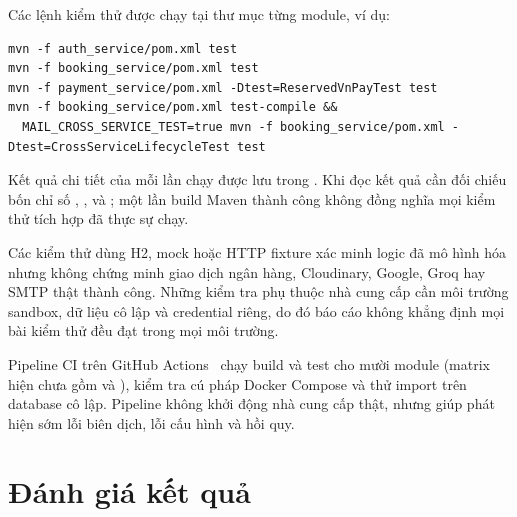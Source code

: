 Các lệnh kiểm thử được chạy tại thư mục từng module, ví dụ:

\begin{lstlisting}[style=json,caption={Lệnh kiểm thử tiêu biểu},label={lst:test-cmd}]
mvn -f auth_service/pom.xml test
mvn -f booking_service/pom.xml test
mvn -f payment_service/pom.xml -Dtest=ReservedVnPayTest test
mvn -f booking_service/pom.xml test-compile &&
  MAIL_CROSS_SERVICE_TEST=true mvn -f booking_service/pom.xml -Dtest=CrossServiceLifecycleTest test
\end{lstlisting}

Kết quả chi tiết của mỗi lần chạy được lưu trong . Khi đọc kết quả cần đối chiếu bốn chỉ số , ,  và ; một lần build Maven thành công không đồng nghĩa mọi kiểm thử tích hợp đã thực sự chạy.

\begin{warningbox}
Các kiểm thử dùng H2, mock hoặc HTTP fixture xác minh logic đã mô hình hóa nhưng không chứng minh giao dịch ngân hàng, Cloudinary, Google, Groq hay SMTP thật thành công. Những kiểm tra phụ thuộc nhà cung cấp cần môi trường sandbox, dữ liệu cô lập và credential riêng, do đó báo cáo không khẳng định mọi bài kiểm thử đều đạt trong mọi môi trường.
\end{warningbox}

Pipeline CI trên GitHub Actions~\cite{github} chạy build và test cho mười module (matrix hiện chưa gồm  và ), kiểm tra cú pháp Docker Compose và thử import  trên database cô lập. Pipeline không khởi động nhà cung cấp thật, nhưng giúp phát hiện sớm lỗi biên dịch, lỗi cấu hình và hồi quy.

\section{Đánh giá kết quả}
\label{sec:danh-gia}

